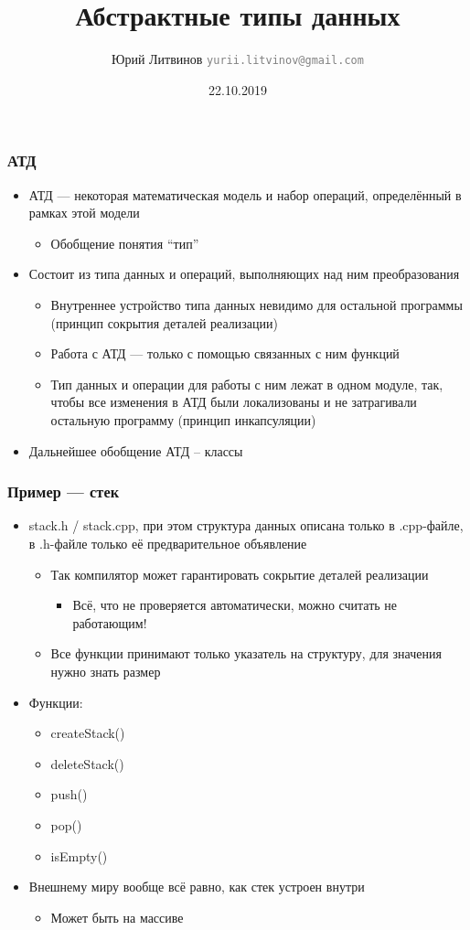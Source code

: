 \documentclass[xetex,mathserif,serif]{beamer}
\title{Абстрактные типы данных}
\author[Юрий Литвинов]{Юрий Литвинов \newline \textcolor{gray}{\small\texttt{yurii.litvinov@gmail.com}}}
\date{22.10.2019}
\begin{document}
	
	\frame{\titlepage}
	
	\begin{frame}
		\frametitle{АТД}
		\begin{itemize}
			\item АТД --- некоторая математическая модель и набор операций, определённый в рамках этой модели
			\begin{itemize}
				\item Обобщение понятия ``тип''
			\end{itemize}
			\item Состоит из типа данных и операций, выполняющих над ним преобразования
			\begin{itemize}
				\item Внутреннее устройство типа данных невидимо для остальной программы (принцип сокрытия деталей реализации)
				\item Работа с АТД --- только с помощью связанных с ним функций
				\item Тип данных и операции для работы с ним лежат в одном модуле, так, чтобы все изменения в АТД были локализованы и не затрагивали остальную программу (принцип инкапсуляции)
			\end{itemize}
			\item Дальнейшее обобщение АТД – классы
		\end{itemize}
	\end{frame}

	\begin{frame}
		\frametitle{Пример --- стек}
		\begin{itemize}
			\item stack.h / stack.cpp, при этом структура данных описана только в .cpp-файле, в .h-файле только её предварительное объявление
			\begin{itemize}
				\item Так компилятор может гарантировать сокрытие деталей реализации
				\begin{itemize}
					\item Всё, что не проверяется автоматически, можно считать не работающим!
				\end{itemize}
				\item Все функции принимают только указатель на структуру, для значения нужно знать размер
			\end{itemize}
			\item Функции:
			\begin{itemize}
				\item createStack()
				\item deleteStack()
				\item push()
				\item pop()
				\item isEmpty()
			\end{itemize}
			\item Внешнему миру вообще всё равно, как стек устроен внутри
			\begin{itemize}
				\item Может быть на массиве
			\end{itemize}
		\end{itemize}
	\end{frame}
\end{document}
